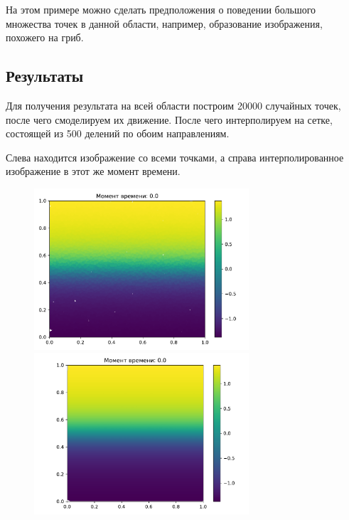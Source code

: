         На этом примере можно сделать предположения о поведении большого множества точек в данной области, например, образование изображения, похожего на гриб.


    \subsection{Результаты}
        Для получения результата на всей области построим 20000 случайных точек, после чего смоделируем их движение. После чего интерполируем на сетке, состоящей из 500 делений по обоим направлениям.

        Слева находится изображение со всеми точками, а справа интерполированное изображение в этот же момент времени.

    \begin{figure}[H]
        \centering
        \includegraphics[width=8cm]{pictures/s0.pdf}
        \includegraphics[width=8cm]{pictures/p0.pdf}
    \end{figure}
